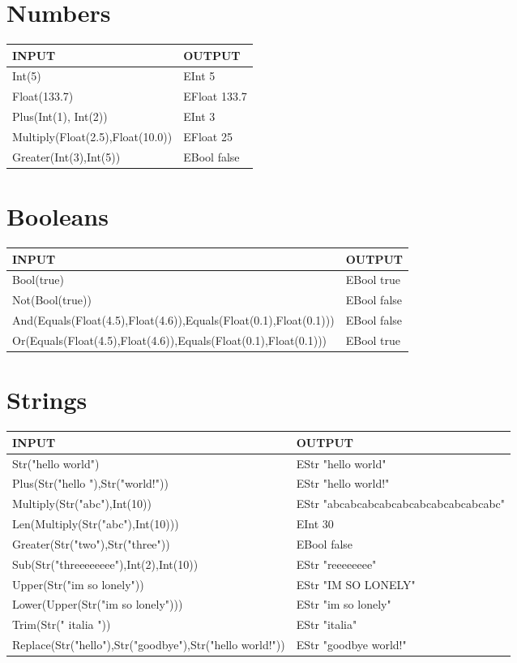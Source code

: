 \documentclass[11pt]{report}
\begin{document}
\chapter{Numbers}
\label{sec:orgad91d21}
\begin{center}
\begin{tabularx}{\textwidth}{XX}
INPUT & OUTPUT\\
\hline
Int(5) & EInt 5\\
Float(133.7) & EFloat 133.7\\
Plus(Int(1), Int(2)) & EInt 3\\
Multiply(Float(2.5),Float(10.0)) & EFloat 25\\
Greater(Int(3),Int(5)) & EBool false\\
\end{tabularx}
\end{center}
\chapter{Booleans}
\label{sec:orge0d74d6}
\begin{center}
\begin{tabularx}{\textwidth}{Xl}
INPUT & OUTPUT\\
\hline
Bool(true) & EBool true\\
Not(Bool(true)) & EBool false\\
And(Equals(Float(4.5),Float(4.6)),Equals(Float(0.1),Float(0.1))) & EBool false\\
Or(Equals(Float(4.5),Float(4.6)),Equals(Float(0.1),Float(0.1))) & EBool true\\
\end{tabularx}
\end{center}
\chapter{Strings}
\label{sec:orgb07dc6b}
\begin{center}
\begin{tabularx}{\textwidth}{XX}
INPUT & OUTPUT\\
\hline
Str("hello world") & EStr "hello world"\\
Plus(Str("hello "),Str("world!")) & EStr "hello world!"\\
Multiply(Str("abc"),Int(10)) & EStr "abcabcabcabcabcabcabcabcabcabc"\\
Len(Multiply(Str("abc"),Int(10))) & EInt 30\\
Greater(Str("two"),Str("three")) & EBool false\\
Sub(Str("threeeeeeee"),Int(2),Int(10)) & EStr "reeeeeeee"\\
Upper(Str("im so lonely")) & EStr "IM SO LONELY"\\
Lower(Upper(Str("im so lonely"))) & EStr "im so lonely"\\
Trim(Str("     italia      ")) & EStr "italia"\\
Replace(Str("hello"),Str("goodbye"),Str("hello world!")) & EStr "goodbye world!"\\
\end{tabularx}
\end{center}
\end{document}
